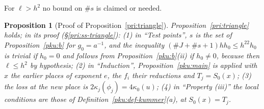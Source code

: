 \documentclass[10pt]{amsart}
\newtheorem{proposition}[theorem]{Proposition}
\theoremstyle{definition}
\theoremstyle{remark}
\begin{document}
For $\ell>h^2$ no bound on $\#s$ is claimed or needed.

\begin{proposition}[Proof of Proposition~\ref{pri:triangle}]\label{pku:triangle}
Proposition~\ref{pri:triangle} holds; in its proof (\S\ref{pri:ss-triangle}): (1) in ``Test points'', $s$ is the set
of Proposition~\ref{pku:b} for $g_0=a^{-1}$, and the inequality $(\#J+\#s+1)hh_0\le h^{22}h_0$ is
trivial if $h_0=0$ and follows from Proposition~\ref{pku:b}(ii) if $h_0\ne0$, because then $\ell\le
h^2$ by hypothesis; (2) in ``Induction'', Proposition~\ref{pku:main} is applied with $x$ the earlier
places of exponent $e$, the $f_i$ their reductions and $T_j=S_0(x)$; (3) the loss at the new place
is $2\kappa_j(\phi_j)=4\kappa_0(u)$; (4) in ``Property (iii)'' the local conditions are those of
Definition~\ref{pku:def-kummer}(a), at $S_0(x)=T_j$.
\end{proposition}
\end{document}
